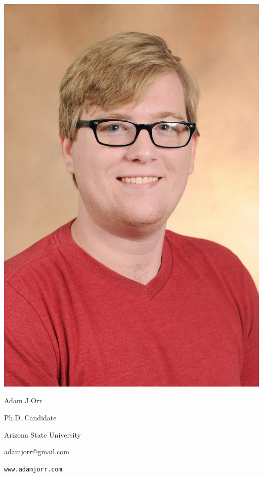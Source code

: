 \documentclass[11pt,a4paper]{memoir}
\begin{document}
\noindent
\begin{minipage}[t][][b]{.3\textwidth}
	\centering
	\includegraphics[valign=c,width=\linewidth]{headshot} %
\end{minipage}%
\begin{minipage}[t][][b]{.7\textwidth}
	\centering
	\hfill\break
	\hfill\break
	Adam J Orr

	Ph.D. Candidate

	Arizona State University

	\faEnvelopeO \space adamjorr@gmail.com

	\faLink \space \texttt{www.adamjorr.com}
\end{minipage}%
\vfill
\clearpage
\end{document}
